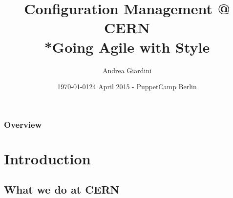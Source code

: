 \documentclass[aspectratio=169]{beamer}
\title[Configuration Management @ CERN]{Configuration Management @ CERN\\*Going Agile with Style}
\author{Andrea Giardini}
\date{\today}
\institute[CERN]
{
CERN \\
\medskip
\textit{andrea.giardini@cern.ch}
}
\date{24 April 2015 - PuppetCamp Berlin} %
\begin{document}
\cernSplashBlue

\begin{frame}
\titlepage
\end{frame}

\begin{frame}
\frametitle{Overview}
\tableofcontents
\end{frame}


\section{Introduction}

\subsection{What we do at CERN}
\end{document}
